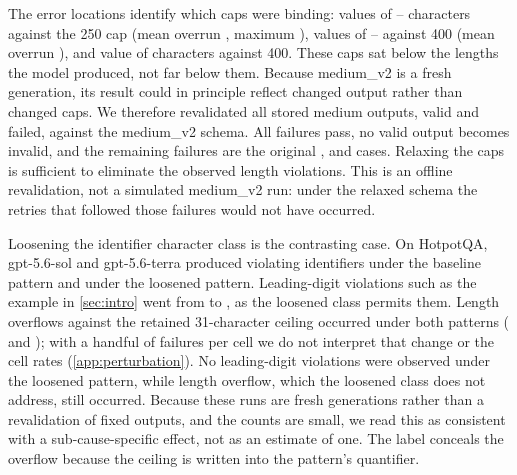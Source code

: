 The error locations identify which caps were binding:
  values of
--
characters against the 250 cap (mean overrun
, maximum
), 
 values of
-- against 400 (mean
overrun ), and
  value of
 characters against 400. These caps sat below
the lengths the model produced, not far below them. Because medium\_v2 is
a fresh generation, its result could in principle reflect changed output
rather than changed caps. We therefore revalidated all  stored
medium outputs, valid and failed, against the medium\_v2 schema. All
  failures pass,
no valid output becomes invalid, and the remaining
 failures are the original ,
 and  cases. Relaxing the caps
is sufficient to eliminate the observed length violations. This is an
offline revalidation, not a simulated medium\_v2 run: under the relaxed
schema the retries that followed those failures would not have occurred.

Loosening the identifier character class is the contrasting case. On
HotpotQA, gpt-5.6-sol and gpt-5.6-terra produced
 violating identifiers under the baseline
pattern and  under the
loosened pattern. Leading-digit violations such as the example in
\cref{sec:intro} went from  to
, as the loosened class
permits them. Length overflows against the retained 31-character ceiling
occurred under both patterns ( and
); with a handful of
failures per cell we do not interpret that change or the cell rates
(\cref{app:perturbation}). No leading-digit violations were observed
under the loosened pattern, while length overflow, which the loosened
class does not address, still occurred. Because these runs are fresh
generations rather than a revalidation of fixed outputs, and the counts
are small, we read this as consistent with a sub-cause-specific effect,
not as an estimate of one. The  label conceals the
overflow because the ceiling is written into the pattern's quantifier.

